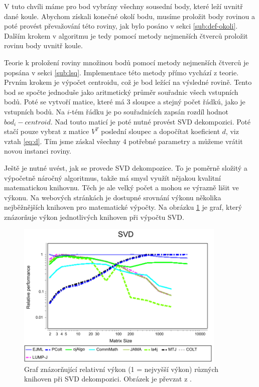 \documentclass[11pt,twoside,a4paper]{book}
\begin{document}
V tuto chvíli máme pro bod vybrány všechny sousední body, které leží uvnitř dané koule. Abychom získali konečné okolí bodu, musíme proložit body rovinou a poté provést převažování této roviny, jak bylo posáno v sekci \ref{sub:def-okoli}. Dalším krokem v algoritmu je tedy pomocí metody nejmenších čtverců proložit rovinu body uvnitř koule.

Teorie k proložení roviny množinou bodů pomocí metody nejmenších čtverců je popsána v sekci \ref{sub:lsq}. Implementace této metody přímo vychází z teorie. Prvním krokem je výpočet centroidu, což je bod ležící na výsledné rovině. Tento bod se spočte jednoduše jako aritmetický průměr souřadnic všech vstupních bodů. Poté se vytvoří matice, které má 3 sloupce a stejný počet řádkú, jako je vstupních bodů. Na $i$-tém řádku je po souřadnicích zapsán rozdíl hodnot $bod_i - centroid$. Nad touto maticí je poté nutné provést SVD dekompozici. Poté stačí pouze vybrat z matice $V^T$ poslední sloupec a dopočítat koeficient $d$, viz vztah \ref{eq:d}. Tím jsme záskal všechny 4 potřebné parametry a můžeme vrátit novou instanci roviny.

Ještě je nutné uvést, jak se provede SVD dekompozice. To je poměrně složitý a výpočetně náročný algoritmus, takže má smysl využít nějakou kvalitní matematickou knihovnu. Těch je ale velký počet a mohou se výrazně lišit ve výkonu. Na webových stránkách \cite{svdbench} je dostupné srovnání výkonu několika nejběžnějších knihoven pro matematické výpočty. Na obrázku \ref{fig:svd-bench} je graf, který znázorňuje výkon jednotlivých knihoven při výpočtu SVD.

\begin{figure}[ht]
\begin{center}
\includegraphics[width=10cm]{figures/svd}
\caption{Graf znázorňující relativní výkon (1 = nejvyšší výkon) různých knihoven při SVD dekompozici. Obrázek je převzat z \cite{svdbench}.}
\label{fig:svd-bench}
\end{center}
\end{figure}
\end{document}
